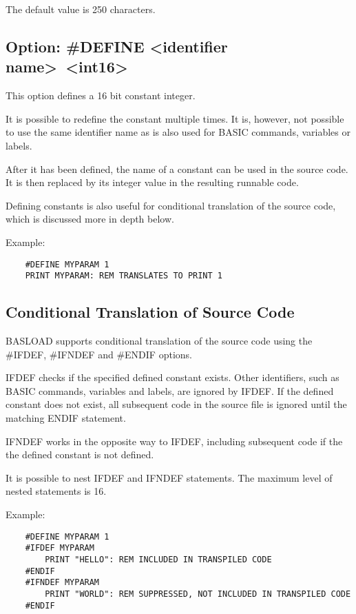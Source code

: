 \documentclass{article}
\begin{document}
        The default value is 250 characters.

    \subsection{Option: \#DEFINE \textless identifier name\textgreater \  \textless int16\textgreater }
    
        This option defines a 16 bit constant integer.
        
        It is possible to redefine the constant multiple times.
        It is, however, not possible to use the same identifier name as is also
        used for BASIC commands, variables or labels.

        After it has been defined, the name of a constant can be used in
        the source code. It is then replaced by its integer value in the resulting
        runnable code.

        Defining constants is also useful for conditional translation of the
        source code, which is discussed more in depth below.

        Example:

        \begin{verbatim}
    #DEFINE MYPARAM 1
    PRINT MYPARAM: REM TRANSLATES TO PRINT 1
        \end{verbatim}
    
    \subsection{Conditional Translation of Source Code}
        
        BASLOAD supports conditional translation of the source code using
        the \#IFDEF, \#IFNDEF and \#ENDIF options.

        IFDEF checks if the specified defined constant exists. Other identifiers,
        such as BASIC commands, variables and labels, are ignored by IFDEF.
        If the defined constant does not exist, all subsequent code in the source
        file is ignored until the matching ENDIF statement.

        IFNDEF works in the opposite way to IFDEF, including subsequent code if the
        the defined constant is not defined.

        It is possible to nest IFDEF and IFNDEF statements. The maximum level of nested
        statements is 16.

        Example:

        \begin{verbatim}
    #DEFINE MYPARAM 1
    #IFDEF MYPARAM
        PRINT "HELLO": REM INCLUDED IN TRANSPILED CODE
    #ENDIF
    #IFNDEF MYPARAM
        PRINT "WORLD": REM SUPPRESSED, NOT INCLUDED IN TRANSPILED CODE
    #ENDIF
        \end{verbatim}
    
\end{document}
